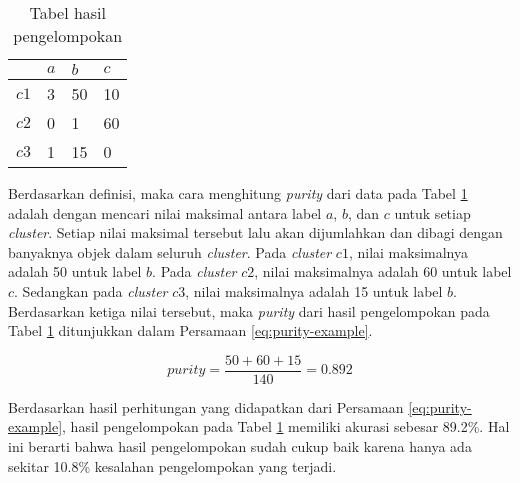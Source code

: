 \begin{table}[H]
\caption{Tabel hasil pengelompokan}
\centering
\begin{tabular}{|l|l|l|l|}
\hline
   & $a$ & $b$ & $c$ \\ \hline
$c1$ & 3  & 50 & 10  \\ \hline
$c2$ & 0  & 1  & 60  \\ \hline
$c3$ & 1  & 15 & 0   \\ \hline
\end{tabular}
\label{tbl:purity-example}
\end{table}

Berdasarkan definisi, maka cara menghitung \textit{purity} dari data pada Tabel \ref{tbl:purity-example} adalah dengan mencari nilai maksimal antara label $a$, $b$, dan $c$ untuk setiap \textit{cluster}. Setiap nilai maksimal tersebut lalu akan dijumlahkan dan dibagi dengan banyaknya objek dalam seluruh \textit{cluster}. Pada \textit{cluster} $c1$, nilai maksimalnya adalah 50 untuk label $b$. Pada \textit{cluster} $c2$, nilai maksimalnya adalah 60 untuk label $c$. Sedangkan pada \textit{cluster} $c3$, nilai maksimalnya adalah 15 untuk label $b$. Berdasarkan ketiga nilai tersebut, maka \textit{purity} dari hasil pengelompokan pada Tabel \ref{tbl:purity-example} ditunjukkan dalam Persamaan \ref{eq:purity-example}.

\begin{equation}
\label{eq:purity-example}
	purity = \frac{50 + 60 + 15}{140} = 0.892
\end{equation}

Berdasarkan hasil perhitungan yang didapatkan dari Persamaan \ref{eq:purity-example}, hasil pengelompokan pada Tabel \ref{tbl:purity-example} memiliki akurasi sebesar 89.2\%. Hal ini berarti bahwa hasil pengelompokan sudah cukup baik karena hanya ada sekitar 10.8\% kesalahan pengelompokan yang terjadi.